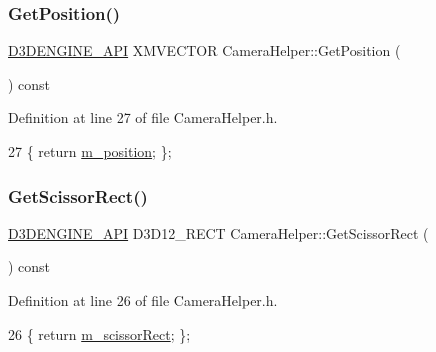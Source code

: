 \subsubsection{\texorpdfstring{Get\+Position()}{GetPosition()}}
{\footnotesize\ttfamily \mbox{\hyperlink{stdafx_8h_a8ee2d990c5dfba7794dd2b60741d7722}{D3\+D\+E\+N\+G\+I\+N\+E\+\_\+\+A\+PI}} X\+M\+V\+E\+C\+T\+OR Camera\+Helper\+::\+Get\+Position (\begin{DoxyParamCaption}{ }\end{DoxyParamCaption}) const\hspace{0.3cm}{\ttfamily [inline]}}



Definition at line 27 of file Camera\+Helper.\+h.


\begin{DoxyCode}
27 \{ \textcolor{keywordflow}{return} \mbox{\hyperlink{class_camera_helper_a9f225b52b05df432872e8b541079935f}{m\_position}}; \};
\end{DoxyCode}
\mbox{\label{class_camera_helper_a75e575bef9dd1e3f6b2608be1b5f15b7}} 
\subsubsection{\texorpdfstring{Get\+Scissor\+Rect()}{GetScissorRect()}}
{\footnotesize\ttfamily \mbox{\hyperlink{stdafx_8h_a8ee2d990c5dfba7794dd2b60741d7722}{D3\+D\+E\+N\+G\+I\+N\+E\+\_\+\+A\+PI}} D3\+D12\+\_\+\+R\+E\+CT Camera\+Helper\+::\+Get\+Scissor\+Rect (\begin{DoxyParamCaption}{ }\end{DoxyParamCaption}) const\hspace{0.3cm}{\ttfamily [inline]}}



Definition at line 26 of file Camera\+Helper.\+h.


\begin{DoxyCode}
26 \{ \textcolor{keywordflow}{return} \mbox{\hyperlink{class_camera_helper_add052fea87500f1d3b2732ec46c3ae85}{m\_scissorRect}}; \};
\end{DoxyCode}
\mbox{\label{class_camera_helper_ac9033557a8988c86d0daf3aab1bbfa7f}} 
